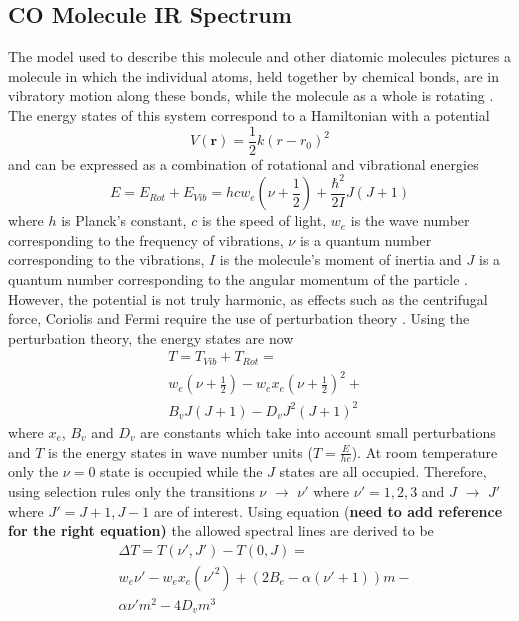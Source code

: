 \documentclass[reprint,amsmath,amssymb,aps, prl]{revtex4-2}
\begin{document}
\subsection{CO Molecule IR Spectrum}
The model used to describe this molecule and other diatomic molecules pictures a molecule in which the individual atoms, held together by chemical bonds, are in vibratory motion along these bonds, while the molecule as a whole is rotating \cite{alpert}. The energy states of this system correspond to a Hamiltonian with a potential 
\begin{equation} \label{eq:CO_Potential}
V(\boldsymbol{r})=\frac{1}{2}k(r-r_0)^2
\end{equation}
and can be expressed as a combination of rotational and vibrational energies
\begin{equation} \label{eq:CO_RotVibEnrg}
E=E_{Rot}+E_{Vib}= hcw_{e}(\nu +\frac{1}{2}) + \frac{\hbar  ^2}{2I}J(J+1)
\end{equation}
where $h$ is Planck's constant, $c$ is the speed of light, $w_{e}$ is the wave number corresponding to the frequency of vibrations, $\nu$ is a quantum number corresponding to the vibrations,  $I$ is the molecule's moment of inertia and $J$ is a quantum number corresponding to the angular momentum of the particle \cite{griffithsQM}. However, the potential is not truly harmonic, as effects such as the centrifugal force, Coriolis and Fermi \cite{alpert} require the use of perturbation theory \cite{samurai}. Using the perturbation theory, the energy states are now
\begin{equation} \label{eq:CO_PeturbRotVibEnrg}
\begin{split}
& T=T_{Vib}+T_{Rot}=\\
& w_{e}(\nu +\frac{1}{2}) -w_{e}x_{e}(\nu +\frac{1}{2})^2+ \\
& B_{v}J(J+1)-D_{v}J^2(J+1)^2 
\end{split}
\end{equation}
where $x_{e}$, $B_{v}$ and $D_{v}$ are constants which take into account small perturbations and $T$ is the energy states in wave number units ($T=\frac{E}{hc}$). At room temperature only the $\nu=0$ state is occupied while the $J$ states are all occupied. Therefore, using selection rules \cite{griffithsQM} only the transitions $\nu$ $\rightarrow $ $\nu'$  where $\nu ' =1,2,3$  and $J$ $\rightarrow $ $J'$ where $J'=J+1,J-1$   are of interest. Using equation (\textbf{need to add reference for the right equation)} the allowed spectral lines are derived to be
\begin{equation} \label{eq:CO_DiffPeturbEnrg}
\begin{split}
& \Delta T =T(\nu ',J')-T(0,J)=\\
& w_{e}\nu' -w_{e}x_{e}(\nu'^{2})+(2B_{e}-\alpha(\nu'+1))m-\\
& \alpha\nu'm^2-4D_{v}m^{3}
\end{split}
\end{equation}
\end{document}
